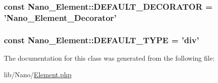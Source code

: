 \hypertarget{classNano__Element_5eb03c33ce648f7e3d11a361874e56d1}{
\subsubsection[{DEFAULT\_\-DECORATOR}]{\setlength{\rightskip}{0pt plus 5cm}const {\bf Nano\_\-Element::DEFAULT\_\-DECORATOR} = 'Nano\_\-Element\_\-Decorator'}}
\label{classNano__Element_5eb03c33ce648f7e3d11a361874e56d1}


\hypertarget{classNano__Element_3a521fbc08c03c8c11a7476714907d22}{
\subsubsection[{DEFAULT\_\-TYPE}]{\setlength{\rightskip}{0pt plus 5cm}const {\bf Nano\_\-Element::DEFAULT\_\-TYPE} = 'div'}}
\label{classNano__Element_3a521fbc08c03c8c11a7476714907d22}




The documentation for this class was generated from the following file:\begin{CompactItemize}
\item 
lib/Nano/\hyperlink{Element_8php}{Element.php}\end{CompactItemize}
